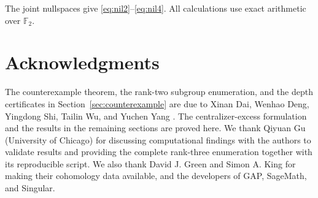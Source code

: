\documentclass[11pt]{amsart}
\theoremstyle{definition}
\theoremstyle{remark}
\newcommand{\F}{\mathbb F}
\begin{document}
The joint nullspaces give \eqref{eq:nil2}--\eqref{eq:nil4}.  All calculations use exact arithmetic over \(\F_2\).


\section*{Acknowledgments}

The counterexample theorem, the rank-two subgroup enumeration, and the depth certificates in Section~\ref{sec:counterexample} are due to Xinan Dai, Wenhao Deng, Yingdong Shi, Tailin Wu, and Yuchen Yang \cite{DaiEtAl2026}.  The centralizer-excess formulation and the results in the remaining sections are proved here.  We thank Qiyuan Gu (University of Chicago) for discussing computational findings with the authors to validate results and providing the complete rank-three enumeration together with its reproducible script.  We also thank David J. Green and Simon A. King for making their cohomology data available, and the developers of GAP, SageMath, and Singular.
\end{document}
